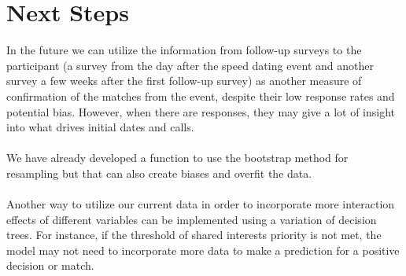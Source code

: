 \documentclass{article}
\begin{document}
\section{Next Steps}
In the future we can utilize the information from follow-up surveys to the participant (a survey from the day after the speed dating event and another survey a few weeks after the first follow-up survey) as another measure of confirmation of the matches from the event, despite their low response rates and potential bias.  However, when there are responses, they may give a lot of insight into what drives initial dates and calls.\\
\null\\
We have already developed a function to use the bootstrap method for resampling but that can also create biases and overfit the data. \\
\null\\
Another way to utilize our current data in order to incorporate more interaction effects of different variables can be implemented using a variation of decision trees. For instance, if the threshold of shared interests priority is not met, the model may not need to incorporate more data to make a prediction for a positive decision or match.  
\end{document}
